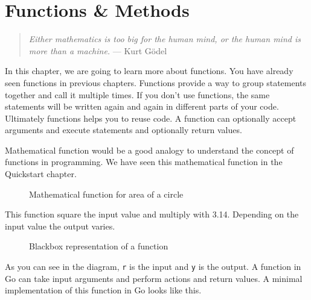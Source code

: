\cleardoublepage
{}
\chapter{Functions \& Methods}

\begin{quote}
\textit{Either mathematics is too big for the human mind, or the human mind is
more than a machine.} --- Kurt Gödel
\end{quote}

In this chapter, we are going to learn more about functions.  You have
already seen functions in previous chapters.  Functions provide a way
to group statements together and call it multiple times.  If you don't
use functions, the same statements will be written again and again in
different parts of your code.  Ultimately functions helps you to reuse
code.  A function can optionally accept arguments and execute
statements and optionally return values.

Mathematical function would be a good analogy to understand the
concept of functions in programming.  We have seen this mathematical
function in the Quickstart chapter.

\begin{figure}[h!]
\centering
{}
\caption{Mathematical function for area of a circle}
\end{figure}

This function square the input value and multiply with 3.14.
Depending on the input value the output varies.

\begin{figure}[h!]
\centering
{}
\caption{Blackbox representation of a function}
\end{figure}

As you can see in the diagram, \texttt{r} is the input and \texttt{y}
is the output.  A function in Go can take input arguments and perform
actions and return values.  A minimal implementation of this function
in Go looks like this.

